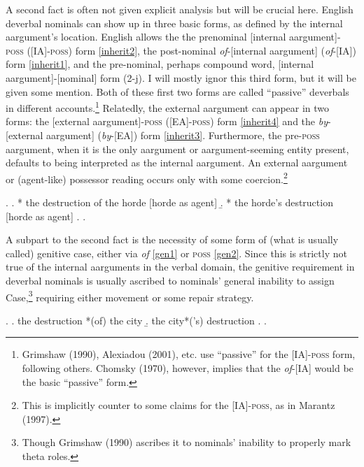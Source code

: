 \documentclass[12pt]{article}
\begin{document}
A second fact is often not given explicit analysis but will be crucial here. English deverbal nominals can show up in three basic forms, as defined by the internal aargument's location. English allows the the prenominal [internal aargument]-\textsc{poss} ([IA]-\textsc{poss}) form \ref{inherit2}, the post-nominal \textit{of}-[internal aargument] (\textit{of}-[IA]) form \ref{inherit1}, and the pre-nominal, perhaps compound word, [internal aargument]-[nominal] form (2-j). I will mostly ignor this third form, but it will be given some mention. Both of these first two forms are called ``passive'' deverbals in different accounts.\footnote{ Grimshaw (1990), Alexiadou (2001), etc. use ``passive'' for the [IA]-\textsc{poss} form, following others. Chomsky (1970), however, implies that the \textit{of}-[IA] would be the basic “passive” form.} Relatedly, the external aargument can appear in two forms: the [external aargument]-\textsc{poss} ([EA]-\textsc{poss}) form \ref{inherit4} and the \textit{by}-[external aargument] (\textit{by}-[EA]) form \ref{inherit3}. Furthermore, the pre-\textsc{poss} aargument, when it is the only aargument or aargument-seeming entity present, defaults to being interpreted as the internal aargument. An external aargument or (agent-like) possessor reading occurs only with some coercion.\footnote{ This is implicitly counter to some claims for the [IA]-\textsc{poss}, as in Marantz (1997).}

\singlespacing

\ex. 
\a. * the destruction of the horde \hfill [horde as agent]
\b. * the horde's destruction \hfill [horde as agent]
\z. \z. \par

\doublespacing

A subpart to the second fact is the necessity of some form of (what is usually called) genitive case, either via \textit{of} \ref{gen1} or \textsc{poss} \ref{gen2}. Since this is strictly not true of the internal aarguments in the verbal domain, the genitive requirement in deverbal nominals is usually ascribed to nominals' general inability to assign Case,\footnote{ Though Grimshaw (1990) ascribes it to nominals' inability to properly mark theta roles.} requiring either movement or some repair strategy.

\singlespacing
\ex. 
\a. \label{gen1} the destruction *(of) the city
\b. \label{gen2} the city*('s) destruction
\z. \z. \par

\doublespacing
\end{document}
